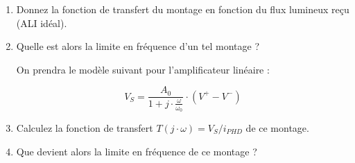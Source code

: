 \bigskip

\begin{enumerate}
	\item Donnez la fonction de transfert du montage en fonction du flux lumineux reçu (ALI idéal).
	\item Quelle est alors la limite en fréquence d'un tel montage ?
	
	\bigskip
	
	On prendra le modèle suivant pour l'amplificateur linéaire :

$$V_S = \frac{A_0}{1 + j \cdot \frac{\omega}{\omega_0}} \cdot (V^+ - V^-)$$
	
	\item Calculez la fonction de transfert $T(j\cdot \omega) = V_S /  i_{PHD}$ de ce montage.
	\item Que devient alors la limite en fréquence de ce montage ?
\end{enumerate}



